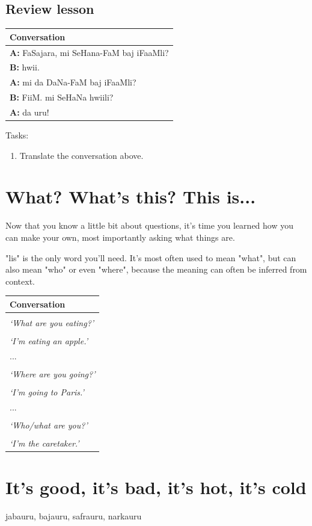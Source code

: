 \documentclass[a5paper,10pt,twoside,openright]{memoir}
\renewcommand{\arraystretch}{1.4}
\newcommand\famword[1]{{\addfontfeatures{Letters=UppercaseSmallCaps}#1}}
\newcommand{\convowidth}{0.862\textwidth}
\newenvironment{conversation}
    {\renewcommand{\arraystretch}{0.75}
    \begin{table}[ht]
        \centering
        \begin{tabular}{p{\convowidth}}
        \toprule
        \textbf{Conversation} \\
        \midrule
    }
    { 
        \bottomrule
        \end{tabular}
    \end{table}
    \renewcommand{\arraystretch}{1.4}
    }
\newcommand{\diaglinetest}[2]{\hspace{1em} 

\begin{minipage}[c][0.5cm][t]{\convowidth}
    \textbf{\uppercase{#1:}} \famword{#2}
\end{minipage} \\}
\newcommand{\diagline}[3]{\hspace{1em} 

\begin{minipage}[c][1cm][t]{\convowidth}
    \textbf{\uppercase{#1:}} \famword{#2} \\
    \textit{`#3'}
\end{minipage} \\}
\begin{document}
\section*{Review lesson}

\begin{conversation}
    \diaglinetest{a}{FaSajara, mi SeHana-FaM baj iFaaMli?}
    \diaglinetest{b}{hwii.}
    \diaglinetest{a}{mi da DaNa-FaM baj iFaaMli?}
    \diaglinetest{b}{FiiM. mi SeHaNa hwiili?}
    \diaglinetest{a}{da uru!}
\end{conversation}

\noindent Tasks:

\begin{enumerate}
    \item Translate the conversation above.
\end{enumerate}

\chapter{What? What's this? This is...}

Now that you know a little bit about questions, it's time you learned how you can make your own, most importantly asking what things are. 

"lis" is the only word you'll need. It's most often used to mean "what", but can also mean "who" or even "where", because the meaning can often be inferred from context.

\begin{conversation}
    \diagline{a}{\famword{mi lis NiiMli?}}{What are you eating?}
    \diagline{b}{\famword{nas PurLi NiiM.}}{I'm eating an apple.}
    \hspace{1.5em}...\\
    \diagline{a}{\famword{mi lis PLiiS}}{Where are you going?}
    \diagline{b}{\famword{nas PARIS-iPLuSa PLiiS.}}{I'm going to Paris.}
    \hspace{1.5em}...\\
    \diagline{a}{mi lisuruli?}{Who/what are you?}
    \diagline{b}{\famword{nas BanaBuru.}}{I'm the caretaker.}
\end{conversation}

\chapter{It's good, it's bad, it's hot, it's cold}

jabauru, bajauru, safrauru, narkauru
\end{document}
